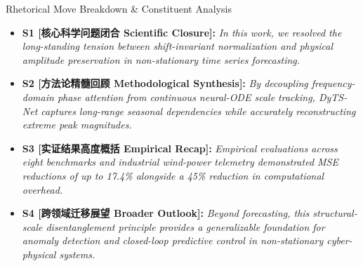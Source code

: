 \begin{TipBox}{Rhetorical Move Breakdown \& Constituent Analysis}
\begin{itemize}[leftmargin=1.5em]
  \item \textbf{S1 [核心科学问题闭合 Scientific Closure]:} \textit{In this work, we resolved the long-standing tension between shift-invariant normalization and physical amplitude preservation in non-stationary time series forecasting.}\par{}
  \item \textbf{S2 [方法论精髓回顾 Methodological Synthesis]:} \textit{By decoupling frequency-domain phase attention from continuous neural-ODE scale tracking, DyTS-Net captures long-range seasonal dependencies while accurately reconstructing extreme peak magnitudes.}\par{}
  \item \textbf{S3 [实证结果高度概括 Empirical Recap]:} \textit{Empirical evaluations across eight benchmarks and industrial wind-power telemetry demonstrated MSE reductions of up to 17.4\% alongside a 45\% reduction in computational overhead.}\par{}
  \item \textbf{S4 [跨领域迁移展望 Broader Outlook]:} \textit{Beyond forecasting, this structural-scale disentanglement principle provides a generalizable foundation for anomaly detection and closed-loop predictive control in non-stationary cyber-physical systems.}\par{}
\end{itemize}
\end{TipBox}
\medskip
\clearpage
